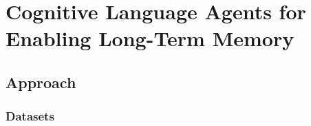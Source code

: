 \cleardoublepage
\chapter{Cognitive Language Agents for Enabling Long-Term Memory}
\label{ch:development}
\label{ch:chapter3}

\section{Approach}
\subsection{Datasets}